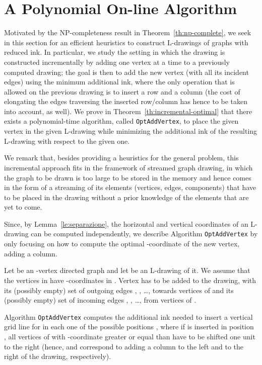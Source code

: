 \documentclass{llncs}
\begin{document}
\section{A Polynomial On-line Algorithm}\label{se:online}

Motivated by the NP-completeness result in Theorem~\ref{th:np-complete}, we seek in this section for an efficient heuristics to construct L-drawings of graphs with reduced ink. In particular, we study the setting in which the drawing is constructed incrementally by adding one vertex at a time to a previously computed drawing; the goal is then to add the new vertex (with all its incident edges) using the minimum additional ink, where the only operation that is allowed on the previous drawing is to insert a row and a column (the cost of elongating the edges traversing the inserted row/column has hence to be taken into account, as well). We prove in Theorem~\ref{th:incremental-optimal} that there exists a polynomial-time algorithm, called \texttt{OptAddVertex}, to place the given vertex in the given L-drawing while minimizing the additional ink of the resulting L-drawing with respect to the given one.

We remark that, besides providing a heuristics for the general problem, this incremental approach fits in the framework of streamed graph drawing, in which the graph to be drawn is too large to be stored in the memory and hence comes in the form of a streaming of its elements (vertices, edges, components) that have to be placed in the drawing without a prior knowledge of the elements that are yet to come.


Since, by Lemma~\ref{le:separazione}, the horizontal and vertical coordinates of an L-drawing can be computed independently, we describe Algorithm \texttt{OptAddVertex} by only focusing on how to compute the optimal -coordinate of the new vertex, adding a column.

Let  be an -vertex directed graph and let  be an L-drawing of it. We assume that the vertices in  have -coordinates in . Vertex  has to be added to the drawing, with its (possibly empty) set of outgoing edges , , \dots,  towards vertices of  and its (possibly empty) set of incoming edges , , \dots,  from vertices of . 

Algorithm \texttt{OptAddVertex} computes the additional ink needed to insert a vertical grid line  for  in each one of the possible  positions , where if  is inserted in position , all vertices of  with -coordinate greater or equal than  have to be shifted one unit to the right (hence,  and  correspond to adding a column to the left and to the right of the drawing, respectively). 
\end{document}
